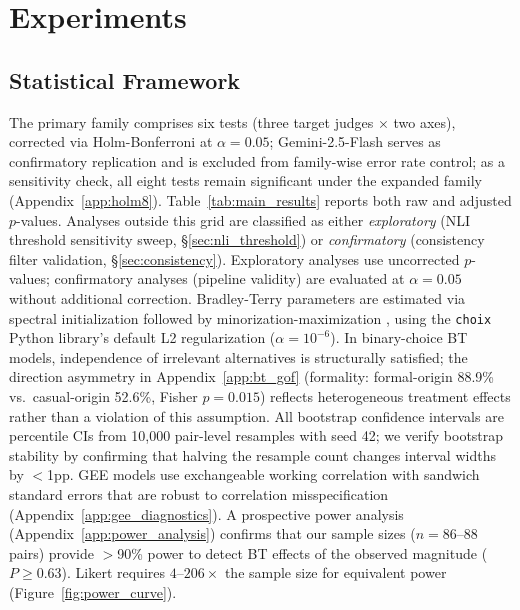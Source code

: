 \section{Experiments}
\label{sec:experiments}


\subsection{Statistical Framework}
\label{sec:stat_framework}

The primary family comprises six tests (three target judges $\times$ two axes), corrected via Holm-Bonferroni at $\alpha = 0.05$; Gemini-2.5-Flash serves as confirmatory replication and is excluded from family-wise error rate control; as a sensitivity check, all eight tests remain significant under the expanded family (Appendix~\ref{app:holm8}).
Table~\ref{tab:main_results} reports both raw and adjusted $p$-values.
Analyses outside this grid are classified as either \emph{exploratory} (NLI threshold sensitivity sweep, \S\ref{sec:nli_threshold}) or \emph{confirmatory} (consistency filter validation, \S\ref{sec:consistency}).
Exploratory analyses use uncorrected $p$-values; confirmatory analyses (pipeline validity) are evaluated at $\alpha = 0.05$ without additional correction.
Bradley-Terry parameters \citep{bradley1952rank,luce1959individual} are estimated via spectral initialization followed by minorization-maximization \citep{hunter2004mm}, using the \texttt{choix} Python library's default L2 regularization ($\alpha = 10^{-6}$).
In binary-choice BT models, independence of irrelevant alternatives is structurally satisfied; the direction asymmetry in Appendix~\ref{app:bt_gof} (formality: formal-origin 88.9\% vs.\ casual-origin 52.6\%, Fisher $p = 0.015$) reflects heterogeneous treatment effects rather than a violation of this assumption.
All bootstrap confidence intervals are percentile CIs from 10{,}000 pair-level resamples with seed 42; we verify bootstrap stability by confirming that halving the resample count changes interval widths by $<$1pp.
GEE models use exchangeable working correlation with sandwich standard errors that are robust to correlation misspecification (Appendix~\ref{app:gee_diagnostics}).
A prospective power analysis (Appendix~\ref{app:power_analysis}) confirms that our sample sizes ($n = 86$--$88$ pairs) provide $>$90\% power to detect BT effects of the observed magnitude ($P \geq 0.63$).
Likert requires $4$--$206\times$ the sample size for equivalent power (Figure~\ref{fig:power_curve}).

